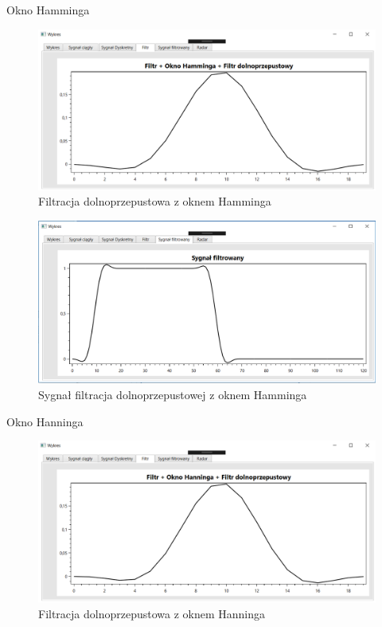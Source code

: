 \documentclass[12pt]{article}
\begin{document}
Okno Hamminga
\begin{figure}[h!]
 \centering
 \includegraphics[width=12.3cm]{prostFDOHm.PNG}
 \vspace{-0.3cm}
 \caption{Filtracja dolnoprzepustowa z oknem Hamminga}
 \label{fdohm}
\end{figure}


\begin{figure}[h!]
 \centering
 \includegraphics[width=12.3cm]{prostSFDHm.PNG}
 \vspace{-0.3cm}
 \caption{Sygnał filtracja dolnoprzepustowej z oknem Hamminga}
 \label{hm}
\end{figure}

\newpage
Okno Hanninga
\begin{figure}[h!]
 \centering
 \includegraphics[width=12.3cm]{prostFDOHn.PNG}
 \vspace{-0.3cm}
 \caption{Filtracja dolnoprzepustowa z oknem Hanninga}
 \label{Wykres dla wyników eksperymentu drugiego}
\end{figure}
\end{document}
